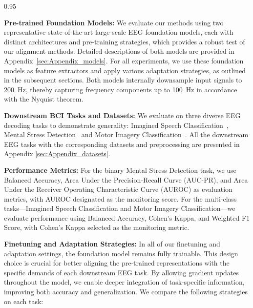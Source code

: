 \documentclass{article} %
\begin{document}
\begin{spacing}{0.95}

\textbf{Pre-trained Foundation Models:} We evaluate our methods using two representative state-of-the-art large-scale EEG foundation models, each with distinct architectures and pre-training strategies, which provides a robust test of our alignment methods. Detailed descriptions of both models are provided in Appendix~\ref{sec:Appendix_models}. For all experiments, we use these foundation models as feature extractors and apply various adaptation strategies, as outlined in the subsequent sections. Both models internally downsample input signals to 200~Hz, thereby capturing frequency components up to 100~Hz in accordance with the Nyquist theorem.

\textbf{Downstream BCI Tasks and Datasets:} We evaluate on three diverse EEG decoding tasks to demonstrate generality: Imagined Speech Classification~\citep{jeong20222020}, Mental Stress Detection~\citep{goldberger2000physiobank,zyma2019electroencephalograms} and Motor Imagery Classification~\citep{brunner2008bci}. All the downstream EEG tasks with the corresponding datasets and preprocessing are presented in Appendix \ref{sec:Appendix_datasets}.

\textbf{Performance Metrics:} For the binary Mental Stress Detection task, we use Balanced Accuracy, Area Under the Precision-Recall Curve (AUC-PR), and Area Under the Receiver Operating Characteristic Curve (AUROC) as evaluation metrics, with AUROC designated as the monitoring score. For the multi-class tasks—Imagined Speech Classification and Motor Imagery Classification—we evaluate performance using Balanced Accuracy, Cohen’s Kappa, and Weighted F1 Score, with Cohen’s Kappa selected as the monitoring metric.

\textbf{Finetuning and Adaptation Strategies:} In all of our finetuning and adaptation settings, the foundation model remains fully trainable. This design choice is crucial for better aligning the pre-trained representations with the specific demands of each downstream EEG task. By allowing gradient updates throughout the model, we enable deeper integration of task-specific information, improving both accuracy and generalization. We compare the following strategies on each task:


\end{spacing}
\end{document}
